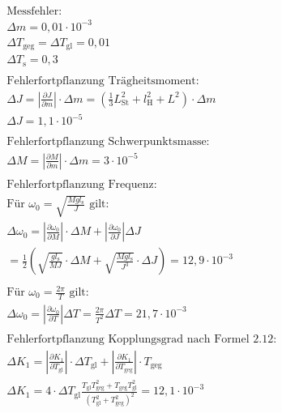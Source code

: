 \documentclass[
12pt,
a4paper,
bibliography=totocnumbered, %
BCOR=1cm, %
oneside, %
]{scrartcl}
\begin{document}
\begin{align}
	\text{Messfehler: }\\
	\Delta m = 0,01 \cdot 10^{-3} \\
	\Delta T_{\text{geg}}=\Delta T_{\text{gl}}=0,01 \\
	\Delta T_{\text{s}}=0,3 \\
	\\
	\text{Fehlerfortpflanzung Trägheitsmoment: }\\
	\Delta J=\left| \frac{\partial J}{\partial m} \right| \cdot \Delta m = (\frac{1}{3} L_{\text{St}}^2+l_\text{H}^2+L^2)\cdot \Delta m\\
	\Delta J=1,1\cdot10^{-5}\\
	\\
	\text{Fehlerfortpflanzung Schwerpunktsmasse: }\\
	\Delta M=\left| \frac{\partial M}{\partial m} \right| \cdot \Delta m = 3\cdot 10^{-5}\\
	\\
	\text{Fehlerfortpflanzung Frequenz: }\\
	\text{Für } \omega_0=\sqrt{\frac{Mgl_{\text{s}}}{J}} \text{ gilt:}\\
	\Delta \omega_0=\left| \frac{\partial \omega_0}{\partial M} \right| \cdot \Delta M + \left| \frac{\partial \omega_0}{\partial J}\right| \Delta J \\
	=\frac{1}{2}\left(\sqrt{\frac{gl_{\text{s}}}{MJ}}\cdot \Delta M + \sqrt{\frac{Mgl_{\text{s}}}{J^3}}\cdot \Delta J\right) =12,9 \cdot 10^{-3} \\
	\\
	\text{Für } \omega_0=\frac{2\pi}{T}\text{ gilt:}\\
	\Delta \omega_0=\left|\frac{\partial \omega_0}{\partial T} \right| \Delta T= \frac{2\pi}{T^2}\Delta T = 21,7\cdot 10^{-3}\\
	\\
	\text{Fehlerfortpflanzung Kopplungsgrad nach Formel 2.12: }\\
	\Delta K_1 = \left| \frac{\partial K_1}{\partial T_{\text{gl}}}\right| \cdot \Delta T_{\text{gl}} + \left|\frac{\partial K_1}{\partial T_{\text{geg}}}\right| \cdot T_{\text{geg}}\\
	\Delta K_1 = 4\cdot \Delta T_{\text{gl}} \frac{T_{\text{gl}}T_{\text{geg}}^2+T_{\text{geg}}T_{\text{gl}}^2}{(T_{\text{gl}}^2+T_{\text{geg}}^2)^2}=12,1\cdot 10^{-3}\\
\end{align}
\end{document}
